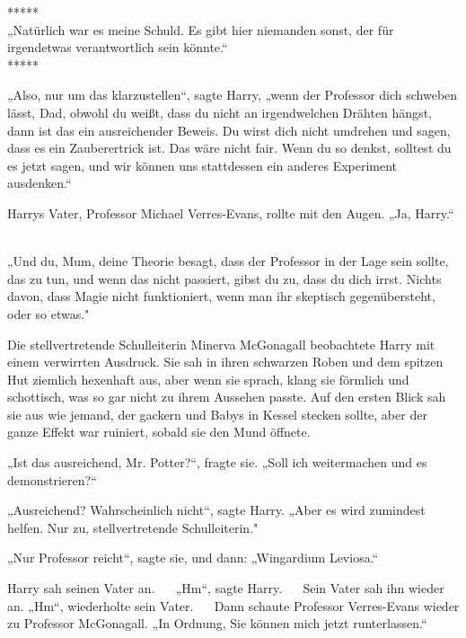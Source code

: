 

\hypertarget{alles-was-ich-glaubte-ist-falsch.}{%

*****\\ „Natürlich war es meine Schuld. Es gibt hier niemanden sonst, der für irgendetwas verantwortlich sein könnte.“ ~ ~\\ *****

„Also, nur um das klarzustellen“, sagte Harry, „wenn der Professor dich schweben lässt, Dad, obwohl du weißt, dass du nicht an irgendwelchen Drähten hängst, dann ist das ein ausreichender Beweis. Du wirst dich nicht umdrehen und sagen, dass es ein Zauberertrick ist. Das wäre nicht fair. Wenn du so denkst, solltest du es jetzt sagen, und wir können uns stattdessen ein anderes Experiment ausdenken.“ ~ ~

Harrys Vater, Professor Michael Verres-Evans, rollte mit den Augen. „Ja, Harry.“ ~

„Und du, Mum, deine Theorie besagt, dass der Professor in der Lage sein sollte, das zu tun, und wenn das nicht passiert, gibst du zu, dass du dich irrst. Nichts davon, dass Magie nicht funktioniert, wenn man ihr skeptisch gegenübersteht, oder so etwas."

Die stellvertretende Schulleiterin Minerva McGonagall beobachtete Harry mit einem verwirrten Ausdruck. Sie sah in ihren schwarzen Roben und dem spitzen Hut ziemlich hexenhaft aus, aber wenn sie sprach, klang sie förmlich und schottisch, was so gar nicht zu ihrem Aussehen passte. Auf den ersten Blick sah sie aus wie jemand, der gackern und Babys in Kessel stecken sollte, aber der ganze Effekt war ruiniert, sobald sie den Mund öffnete.

„Ist das ausreichend, Mr. Potter?“, fragte sie. „Soll ich weitermachen und es demonstrieren?“ ~ ~

„Ausreichend? Wahrscheinlich nicht“, sagte Harry. „Aber es wird zumindest helfen. Nur zu, stellvertretende Schulleiterin."

„Nur Professor reicht“, sagte sie, und dann: „Wingardium Leviosa.“ ~ ~

Harry sah seinen Vater an. ~ ~„Hm“, sagte Harry. ~ ~Sein Vater sah ihn wieder an. „Hm“, wiederholte sein Vater. ~ ~Dann schaute Professor Verres-Evans wieder zu Professor McGonagall. „In Ordnung, Sie können mich jetzt runterlassen.“ ~ ~

}
